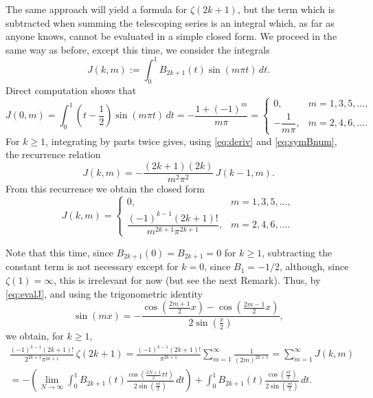 \documentclass[10pt,reqno]{amsart}
\theoremstyle{remark}
\begin{document}
The same approach will yield a formula for $\zeta(2k+1)$, but the term which is subtracted when summing the telescoping series is an integral which, as far as anyone knows, cannot be evaluated in a simple closed form. We proceed in the same way as before, except this time, we consider the integrals
\[
 J(k,m) := \int_0^{1} B_{2k+1}(t) \sin(m\pi t)\,dt.
\]
Direct computation shows that
\[
  J(0,m) = \int_0^{1} \left( t - \frac{1}{2} \right) \sin(m\pi t)\,dt 
         = - \frac{1 + (-1)^{m}}{m \pi}
         = 
  \begin{cases}
  0,                 & m=1,3,5,\dots, 
                     \\
  -\dfrac{1}{m \pi}, & m=2,4,6,\dots.
  \end{cases}
\]
For $k \geq 1$, integrating by parts twice gives, using \eqref{eq:deriv} and \eqref{eq:symBnum}, the recurrence relation
\[
 J(k,m) = - \frac{(2k+1)(2k)}{m^2 \pi^{2}} \,J(k-1,m).
\]
From this recurrence we obtain the closed form
%
\begin{equation}
\label{eq:evalJ}
  J(k,m) = 
  \begin{cases}
  0, & m=1,3,5,\dots, \\
  \dfrac{(-1)^{k-1}(2k+1)!}{m^{2k+1} \pi^{2k+1}}, & m=2,4,6,\dots.
  \end{cases}
\end{equation}

Note that this time, since $B_{2k+1}(0) = B_{2k+1} = 0$ for $k \geq 1$, subtracting the constant term is not necessary except for $k = 0$, since $B_{1} = -1/2$, although, since $\zeta(1) = \infty$, this is irrelevant for now (but see the next Remark). Thus, by \eqref{eq:evalJ}, and using the trigonometric identity 
%
\begin{equation}
\label{eq:telescopeSin}
  \sin(mx) = -\frac{\cos(\frac{2m+1}{2}x)-\cos(\frac{2m-1}{2}x)}{2\sin(\frac{x}{2})},
\end{equation}
we obtain, for $k \geq 1$,
\begin{multline*}
     \frac{(-1)^{k-1}(2k+1)!}{2^{2k+1} \pi^{2k+1}} \,\zeta(2k+1)
  = \frac{(-1)^{k-1}(2k+1)!}{\pi^{2k+1}} \sum_{m=1}^{\infty} \frac{1}{(2m)^{2k+1}}
  = \sum_{m=1}^{\infty} J(k,m)
  \\
  = -\left(\lim_{N \to \infty} \int_0^{1} B_{2k+1}(t) 
  \frac{\cos(\frac{2N+1}{2}\pi t)}{2\sin(\frac{\pi t}{2})}\,dt\right)
  + \int_{0}^{1} B_{2k+1}(t) \frac{\cos(\frac{\pi t}{2})}{2\sin(\frac{\pi t}{2})}\,dt.
\end{multline*}
\end{document}
